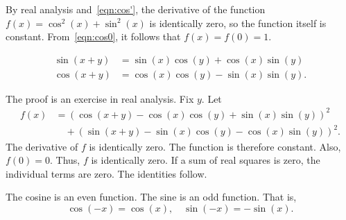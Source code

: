\begin{proved}
  By real analysis and~\eqref{eqn:cos'}, the
  derivative of the function $f(x) = \cos^2(x) +\sin^2(x)$ is
  identically zero, so the function itself is constant.
  From~\eqref{eqn:cos0}, it follows that $f(x)=f(0)=1$.
  \swallowed\end{proved}



\begin{lemma}[]\label{lemma:sin-add}
\begin{align*}
\sin(x+y) &= \sin(x)\cos(y) + \cos(x)\sin(y)\\
\cos(x+y)  &= \cos(x)\cos(y) - \sin(x)\sin(y).
\end{align*}
\end{lemma}
%

\begin{proved}
The proof is an exercise in real analysis.
Fix $y$.  Let
\begin{align*}
f(x) &=(\cos(x+y) - \cos(x)\cos(y) +
\sin(x)\sin(y))^2 \\ 
  &\quad+ (\sin(x+y) -\sin(x)\cos(y) -\cos(x)\sin(y))^2.
\end{align*}
The derivative of $f$ is identically zero.  The function is therefore
constant.  Also, $f(0)=0$.  Thus, $f$ is
identically zero.  If a sum of real squares is zero, the individual
terms are zero. The identities follow.  \swallowed\end{proved}

\begin{lemma}[]\label{lemma:cos-neg}
  The cosine is an even function.  The sine is an odd function.  That
  is,
\[ 
\cos(-x) = \cos(x),\quad\sin(-x) =
    -\sin(x).
\] 
\end{lemma}
%
%
%


